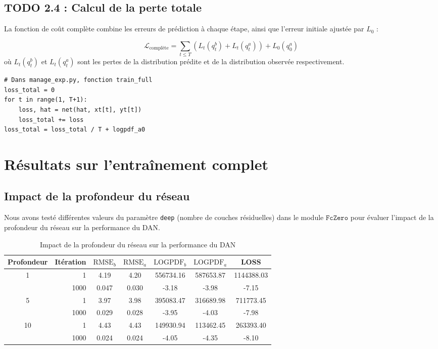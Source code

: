 \documentclass[12pt,a4paper]{article}
\begin{document}
\subsection*{TODO 2.4 : Calcul de la perte totale}
La fonction de coût complète combine les erreurs de prédiction à chaque étape, ainsi que l’erreur initiale ajustée par $L_0$ :

\begin{equation}
    \mathcal{L}_{\text{complète}} = \sum_{t\leq T} \left( L_t(q^b_t) + L_t(q^a_t) \right) + L_0(q^a_0)
\end{equation}
où $L_t(q^b_t)$ et $L_t(q^a_t)$ sont les pertes de la distribution prédite et de la distribution observée respectivement. \\

\begin{lstlisting}
# Dans manage_exp.py, fonction train_full
loss_total = 0
for t in range(1, T+1):
    loss, hat = net(hat, xt[t], yt[t])
    loss_total += loss
loss_total = loss_total / T + logpdf_a0
\end{lstlisting}


\section{Résultats sur l’entraînement complet}


\subsection{Impact de la profondeur du réseau}
Nous avons testé différentes valeurs du paramètre \texttt{deep} (nombre de couches résiduelles) dans le module $\texttt{FcZero}$ pour évaluer l'impact de la profondeur du réseau sur la performance du DAN. \\


\begin{table}[H]
    \centering
    \begin{tabular}{|c|r|c|c|c|c|c|}
    \hline
    \rowcolor{gray!20} \textbf{Profondeur} & \textbf{Itération} & \textbf{$\text{RMSE}_b$} & \textbf{$\text{RMSE}_a$} & \textbf{$\text{LOGPDF}_b$} & \textbf{$\text{LOGPDF}_a$} & \textbf{LOSS} \\
    \hline
    \multirow{2}{*}{1} & 1 & 4.19 & 4.20 & 556734.16 & 587653.87 & 1144388.03 \\
     & 1000 & 0.047 & 0.030 & -3.18 & -3.98 & -7.15 \\
    \hline
    \multirow{2}{*}{5} & 1 & 3.97 & 3.98 & 395083.47 & 316689.98 & 711773.45 \\
     & 1000 & 0.029 & 0.028 & -3.95 & -4.03 & -7.98 \\
    \hline
    \multirow{2}{*}{10} & 1 & 4.43 & 4.43 & 149930.94 & 113462.45 & 263393.40 \\
     & 1000 & 0.024 & 0.024 & -4.05 & -4.35 & -8.10 \\
    \hline
    \end{tabular}
    \caption{Impact de la profondeur du réseau sur la performance du DAN}
    \label{tab:profondeur}
\end{table}
\end{document}

